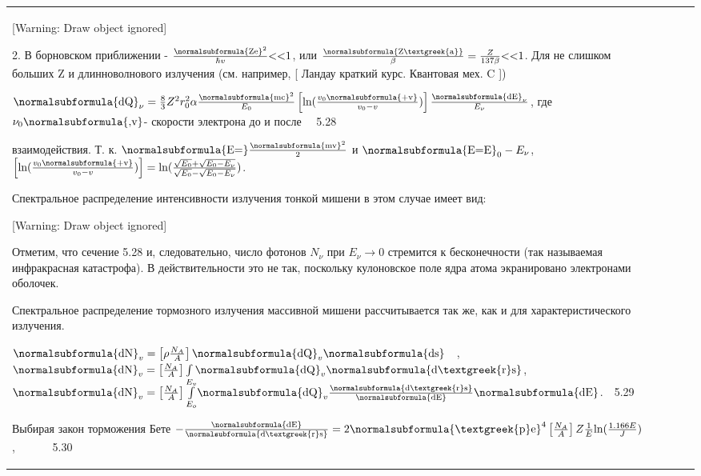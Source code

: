 \documentclass[a4paper,14pt, openany, twoside, draft]{extbook} %
\begin{document}
\begin{flushleft}
\begin{supertabular}{|m{1.7279999cm}|m{1.522cm}|m{1.522cm}|m{1.522cm}|m{1.744cm}|}
[Warning: Draw object ignored]

2. В борновском приближении -  $\frac{\normalsubformula{\text{Ze}}^2}{\hbar v}\text{{\textless}{\textless}1}$, или  $\frac{\normalsubformula{\text{Z\textgreek{a}}}}{\beta }=\frac Z{137\beta }\text{{\textless}{\textless}1}$. Для не слишком больших Z и длинноволнового излучения (см. например, [ Ландау краткий курс. Квантовая мех. C ])

 $\normalsubformula{\text{dQ}}_{\nu }=\frac 8 3Z^2r_0^2\alpha \frac{\normalsubformula{\text{mc}}^2}{E_0}\left[\text{ln}(\frac{v_0\normalsubformula{\text{+v}}}{v_0-v})\right]\frac{\normalsubformula{\text{dE}}_{\nu }}{E_{\nu }}$, где  $\nu _0\normalsubformula{\text{,v}}${}- скорости электрона до и после \ \ 5.28

взаимодействия. Т. к.  $\normalsubformula{\text{E=}}\frac{\normalsubformula{\text{mv}}^2} 2$ и  $\normalsubformula{\text{E=E}}_0-E_{\nu }$,   $\left[\text{ln}(\frac{v_0\normalsubformula{\text{+v}}}{v_0-v})\right]=\text{ln}(\frac{\sqrt{E_0}+\sqrt{E_0-E_{\nu }}}{\sqrt{E_0}-\sqrt{E_0-E_{\nu }}})$.

Спектральное распределение интенсивности излучения тонкой мишени в этом случае имеет вид:

[Warning: Draw object ignored]

Отметим, что сечение 5.28 и, следовательно, число фотонов  $N_{\nu }$ при  $E_{\nu }\rightarrow 0$ стремится к бесконечности (так называемая инфракрасная катастрофа). В действительности это не так, поскольку кулоновское поле ядра атома экранировано электронами оболочек.

Спектральное распределение тормозного излучения массивной мишени рассчитывается так же, как и для характеристического излучения.

 $\normalsubformula{\text{dN}}_v=\left[\rho \frac{N_A} A\right]\normalsubformula{\text{dQ}}_v\normalsubformula{\text{ds}}$\ \ ,\ \  $\normalsubformula{\text{dN}}_v=\left[\frac{N_A} A\right]\int \normalsubformula{\text{dQ}}_v\normalsubformula{\text{d\textgreek{r}s}}$,\ \  $\normalsubformula{\text{dN}}_v=\left[\frac{N_A} A\right]\overset{E_v}{\underset{E_o}{\int }}\normalsubformula{\text{dQ}}_v\frac{\normalsubformula{\text{d\textgreek{r}s}}}{\normalsubformula{\text{dE}}}\normalsubformula{\text{dE}}$.\ \ 5.29

Выбирая закон торможения Бете  $-\frac{\normalsubformula{\text{dE}}}{\normalsubformula{\text{d\textgreek{r}s}}}=2\normalsubformula{\text{\textgreek{p}e}}^4\left[\frac{N_A} A\right]Z\frac 1 E\text{ln}(\frac{1.166E} J)$, \ \ \ \ \ \ 5.30


\end{supertabular}
\end{flushleft}
\end{document}
